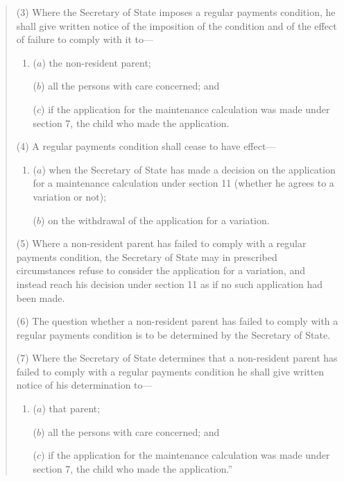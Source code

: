 \documentclass[12pt,a4paper]{article}
\begin{document}
\begin{quotation}
(3) Where the Secretary of State imposes a regular payments condition, he shall give written notice of the imposition of the condition and of the effect of failure to comply with it to—
\begin{enumerate}\item[]
($a$) the non-resident parent;

($b$) all the persons with care concerned; and

($c$) if the application for the maintenance calculation was made under section 7, the child who made the application.
\end{enumerate}

(4) A regular payments condition shall cease to have effect—
\begin{enumerate}\item[]
($a$) when the Secretary of State has made a decision on the application for a maintenance calculation under section 11 (whether he agrees to a variation or not);

($b$) on the withdrawal of the application for a variation.
\end{enumerate}

(5) Where a non-resident parent has failed to comply with a regular payments condition, the Secretary of State may in prescribed circumstances refuse to consider the application for a variation, and instead reach his decision under section 11 as if no such application had been made.

(6) The question whether a non-resident parent has failed to comply with a regular payments condition is to be determined by the Secretary of State.

(7) Where the Secretary of State determines that a non-resident parent has failed to comply with a regular payments condition he shall give written notice of his determination to—
\begin{enumerate}\item[]
($a$) that parent;

($b$) all the persons with care concerned; and

($c$) if the application for the maintenance calculation was made under section 7, the child who made the application.”
\end{enumerate}
\end{quotation}
\end{document}
